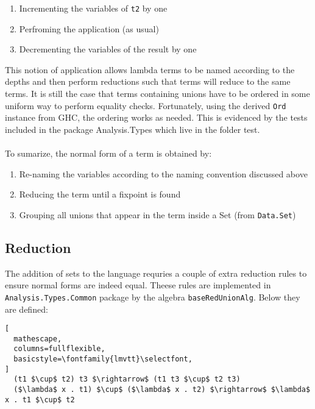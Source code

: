 \documentclass[8pt]{extarticle}
\begin{document}
\begin{enumerate}
\item Incrementing the variables of \verb+t2+ by one
\item Perfroming the application (as usual)
\item Decrementing the variables of the result by one
\end{enumerate}
This notion of application allows lambda terms to be named according to the depths and then perform reductions such that terms will reduce to the same terms. It is still the case that terms containing unions have to be ordered in some uniform way to perform equality checks. Fortunately, using the derived \verb+Ord+ instance from GHC, the ordering works as needed. This is evidenced by the tests included in the package Analysis.Types which live in the folder test.
\\\\
To sumarize, the normal form of a term is obtained by:
\begin{enumerate}
\item Re-naming the variables according to the naming convention discussed above
\item Reducing the term until a fixpoint is found
\item Grouping all unions that appear in the term inside a Set (from \verb+Data.Set+)
\end{enumerate}
\subsection{Reduction}
The addition of sets to the language requries a couple of extra reduction rules to ensure normal forms are indeed equal. Theese rules are implemented in \verb+Analysis.Types.Common+ package by the algebra \verb+baseRedUnionAlg+. Below they are defined:
\begin{lstlisting}[
  mathescape,
  columns=fullflexible,
  basicstyle=\fontfamily{lmvtt}\selectfont,
]
  (t1 $\cup$ t2) t3 $\rightarrow$ (t1 t3 $\cup$ t2 t3)
  ($\lambda$ x . t1) $\cup$ ($\lambda$ x . t2) $\rightarrow$ $\lambda$ x . t1 $\cup$ t2
\end{lstlisting}
\end{document}
